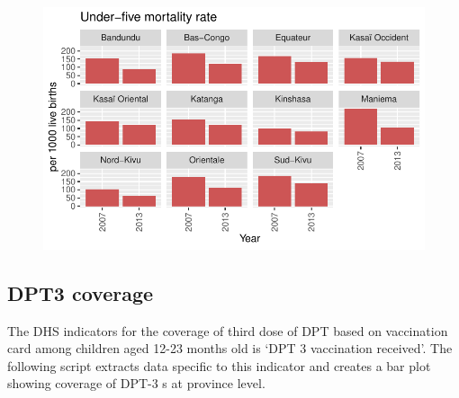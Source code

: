 \documentclass[
  letterpaper,
  DIV=11,
  numbers=noendperiod]{scrreprt}
\begin{document}
\begin{figure}[H]

{\centering \includegraphics{module_02_files/figure-pdf/unnamed-chunk-13-1.pdf}

}

\end{figure}

\hypertarget{dpt3-coverage}{%
\subsection{DPT3 coverage}\label{dpt3-coverage}}

The DHS indicators for the coverage of third dose of DPT based on
vaccination card among children aged 12-23 months old is `DPT 3
vaccination received'. The following script extracts data specific to
this indicator and creates a bar plot showing coverage of DPT-3 s at
province level.
\end{document}
